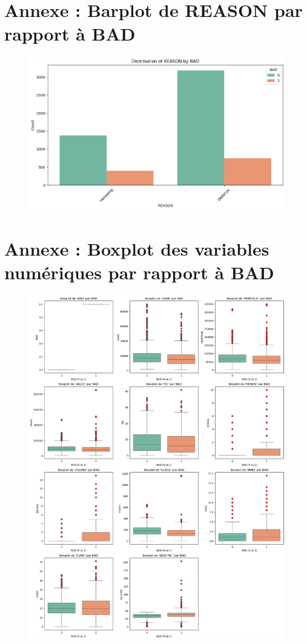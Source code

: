 \documentclass[a4paper,12pt]{report}
\begin{document}
\section{Annexe : Barplot de REASON par rapport à BAD}
\begin{figure}[h!]
  \includegraphics[width=\textwidth]{../images/barplot_reason_by_bad}
  \label{fig:barplot_reason_by_bad}
\end{figure}

\section{Annexe : Boxplot des variables numériques par rapport à BAD}

\begin{figure}[h!]
  \includegraphics[width=\textwidth]{../images/boxplot_var_num}
  \label{fig:boxplot_var_num}
\end{figure}
\end{document}
